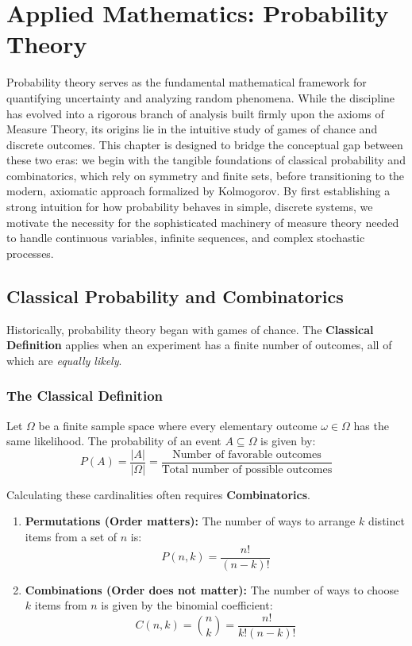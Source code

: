 \chapter{Applied Mathematics: Probability Theory}

Probability theory serves as the fundamental mathematical framework for quantifying uncertainty and analyzing random phenomena. While the discipline has evolved into a rigorous branch of analysis built firmly upon the axioms of Measure Theory, its origins lie in the intuitive study of games of chance and discrete outcomes. This chapter is designed to bridge the conceptual gap between these two eras: we begin with the tangible foundations of classical probability and combinatorics, which rely on symmetry and finite sets, before transitioning to the modern, axiomatic approach formalized by Kolmogorov. By first establishing a strong intuition for how probability behaves in simple, discrete systems, we motivate the necessity for the sophisticated machinery of measure theory needed to handle continuous variables, infinite sequences, and complex stochastic processes.

\section{Classical Probability and Combinatorics}

Historically, probability theory began with games of chance. The \textbf{Classical Definition} applies when an experiment has a finite number of outcomes, all of which are \textit{equally likely}.

\subsection{The Classical Definition}

\begin{definition}
Let $\Omega$ be a finite sample space where every elementary outcome $\omega \in \Omega$ has the same likelihood. The probability of an event $A \subseteq \Omega$ is given by:
\[ P(A) = \frac{|A|}{|\Omega|} = \frac{\text{Number of favorable outcomes}}{\text{Total number of possible outcomes}} \]
\end{definition}

Calculating these cardinalities often requires \textbf{Combinatorics}.

\newpage

\begin{theorem}
\begin{enumerate}
    \item \textbf{Permutations (Order matters):} The number of ways to arrange $k$ distinct items from a set of $n$ is:
    \[ P(n, k) = \frac{n!}{(n-k)!} \]
    \item \textbf{Combinations (Order does not matter):} The number of ways to choose $k$ items from $n$ is given by the binomial coefficient:
    \[ C(n, k) = \binom{n}{k} = \frac{n!}{k!(n-k)!} \]
\end{enumerate}
\end{theorem}

